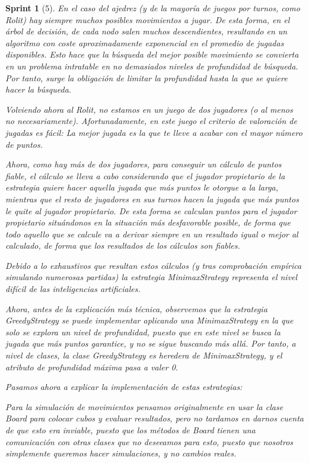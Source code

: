 \documentclass{article}
\theoremstyle{break}
\newtheorem*{sprint}{Sprint}
\begin{document}
\begin{sprint}[5]
En el caso del ajedrez (y de la mayoría de juegos por turnos, como Rolit) hay siempre muchos posibles movimientos a jugar. De esta forma, en el árbol de decisión, de cada nodo salen muchos descendientes, resultando en un algoritmo con coste aproximadamente exponencial en el promedio de jugadas disponibles. Esto hace que la búsqueda del mejor posible movimiento se convierta en un problema intratable en no demasiados niveles de profundidad de búsqueda. Por tanto, surge la obligación de limitar la profundidad hasta la que se quiere hacer la búsqueda.

Volviendo ahora al Rolit, no estamos en un juego de dos jugadores (o al menos no necesariamente).
Afortunadamente, en este juego el criterio de valoración de jugadas es fácil: La mejor jugada es la que te lleve a acabar con el mayor número de puntos.

Ahora, como hay más de dos jugadores, para conseguir un cálculo de puntos fiable, el cálculo se lleva a cabo considerando que el jugador propietario de la estrategia quiere hacer aquella jugada que más puntos le otorgue a la larga, mientras que el resto de jugadores en sus turnos hacen la jugada que más puntos le quite al jugador propietario. De esta forma se calculan puntos para el jugador propietario situándonos en la situación más desfavorable posible, de forma que todo aquello que se calcule va a derivar siempre en un resultado igual o mejor al calculado, de forma que los resultados de los cálculos son fiables.

Debido a lo exhaustivos que resultan estos cálculos (y tras comprobación empírica simulando numerosas partidas) la estrategia MinimaxStrategy representa el nivel difícil de las inteligencias artificiales.

Ahora, antes de la explicación más técnica, observemos que la estrategia GreedyStrategy se puede implementar aplicando una MinimaxStrategy en la que solo se explora un nivel de profundidad, puesto que en este nivel se busca la jugada que más puntos garantice, y no se sigue buscando más allá. Por tanto, a nivel de clases, la clase GreedyStrategy es heredera de MinimaxStrategy, y el atributo de profundidad máxima pasa a valer 0.

Pasamos ahora a explicar la implementación de estas estrategias:

Para la simulación de movimientos pensamos originalmente en usar la clase Board para colocar cubos y evaluar resultados, pero no tardamos en darnos cuenta de que esto era inviable, puesto que los métodos de Board tienen una comunicación con otras clases que no deseeamos para esto, puesto que nosotros simplemente queremos hacer simulaciones, y no cambios reales.


\end{sprint}
\end{document}
